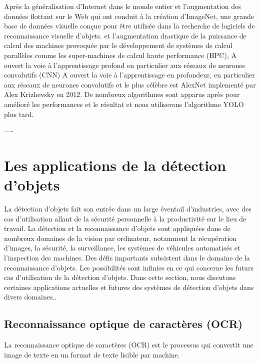 Après la généralisation d'Internet dans le monde entier et l'augmentation des données flottant sur le Web qui ont conduit à la création d'ImageNet, une grande base de données visuelle conçue pour être utilisée dans la recherche de logiciels de reconnaissance visuelle d'objets. et l'augmentation drastique de la puissance de calcul des machines provoquée par le développement de systèmes de calcul parallèles comme les super-machines de calcul haute performance (HPC), A ouvert la voie à l'apprentissage profond en particulier aux réseaux de neurones convolutifs (CNN) A ouvert la voie à l'apprentissage en profondeur, en particulier aux réseaux de neurones
convolutifs et le plus célèbre est AlexNet implementé par Alex Krizhevsky en 2012. De nombreux algorithmes sont apparus après pour amélioré les performances et le résultat et nous utiliserons l'algorithme YOLO plus tard.


----

\section{Les applications de la détection d'objets}
La détection d'objets fait son entrée dans un large éventail d'industries, avec des cas d'utilisation allant de la sécurité personnelle à la productivité sur le lieu de travail. La détection et la reconnaissance d'objets sont appliquées dans de nombreux domaines de la vision par ordinateur, notamment la récupération d'images, la sécurité, la surveillance, les systèmes de véhicules automatisés et l'inspection des machines. Des défis importants subsistent dans le domaine de la reconnaissance d'objets. Les possibilités sont infinies en ce qui concerne les futurs cas d'utilisation de la détection d'objets. Dans cette section, nous discutons  certaines applications actuelles et futures  des systèmes de détection d'objets dans divers domaines..
     \subsection{Reconnaissance optique de caractères (OCR)}
     La reconnaissance optique de caractères (OCR) est le processus qui convertit une image de texte en un format de texte lisible par machine.

